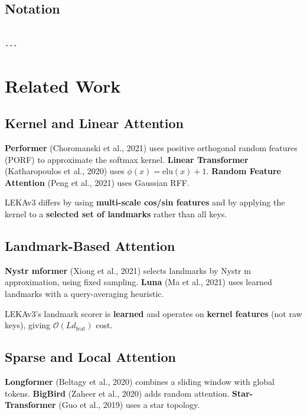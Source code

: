 \subsection{Notation}

\begin{lstlisting}

---
\end{lstlisting}

\section{Related Work}

\subsection{Kernel and Linear Attention}

\textbf{Performer} (Choromanski et al., 2021) uses positive orthogonal random 
features (PORF) to approximate the softmax kernel. \textbf{Linear Transformer} 
(Katharopoulos et al., 2020) uses $\phi(x) = \text{elu}(x) + 1$. 
\textbf{Random Feature Attention} (Peng et al., 2021) uses Gaussian RFF.

LEKAv3 differs by using \textbf{multi-scale cos/sin features} and by applying 
the kernel to a \textbf{selected set of landmarks} rather than all keys.

\subsection{Landmark-Based Attention}

\textbf{Nystr mformer} (Xiong et al., 2021) selects landmarks by Nystr m 
approximation, using fixed sampling. \textbf{Luna} (Ma et al., 2021) uses 
learned landmarks with a query-averaging heuristic.

LEKAv3's landmark scorer is \textbf{learned} and operates on \textbf{kernel features} 
(not raw keys), giving $\mathcal{O}(L d_\text{feat})$ cost.

\subsection{Sparse and Local Attention}

\textbf{Longformer} (Beltagy et al., 2020) combines a sliding window with global 
tokens. \textbf{BigBird} (Zaheer et al., 2020) adds random attention. 
\textbf{Star-Transformer} (Guo et al., 2019) uses a star topology.

